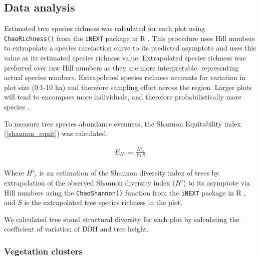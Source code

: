 \documentclass[11pt,a4paper]{article}
\begin{document}
% 
% 

\subsection{Data analysis}
Estimated tree species richness was calculated for each plot using \verb|ChaoRichness()| from the \verb|iNEXT| package in R \citep{Hsieh2016}. This procedure uses Hill numbers to extrapolate a species rarefaction curve to its predicted asymptote and uses this value as its estimated species richness value. Extrapolated species richness was preferred over raw Hill numbers as they are more interpretable, representing actual species numbers. Extrapolated species richness accounts for variation in plot size (0.1-10 ha) and therefore sampling effort across the region. Larger plots will tend to encompass more individuals, and therefore probabilistically more species \citep{}.

To measure tree species abundance evenness, the Shannon Equitability index \citep{} (\autoref{shannon_equit}) was calculated: 

\begin{equation}
	\begin{gathered}
		E_{H'} = \frac{H'_{e}}{\ln{S}} \\
	\end{gathered}
	\label{shannon_equit}
\end{equation}

Where $H'_{e}$ is an estimation of the Shannon diversity index of trees by extrapolation of the observed Shannon diversity index ($H'$) to its asymptote via Hill numbers using the \verb|ChaoShannon()| function from the \verb|iNEXT| package in R \citep{Hsieh2016}, and $S$ is the extrapolated tree species richness in the plot.

We calculated tree stand structural diversity for each plot by calculating the coefficient of variation of DBH and tree height. 

\subsubsection{Vegetation clusters}
\end{document}
